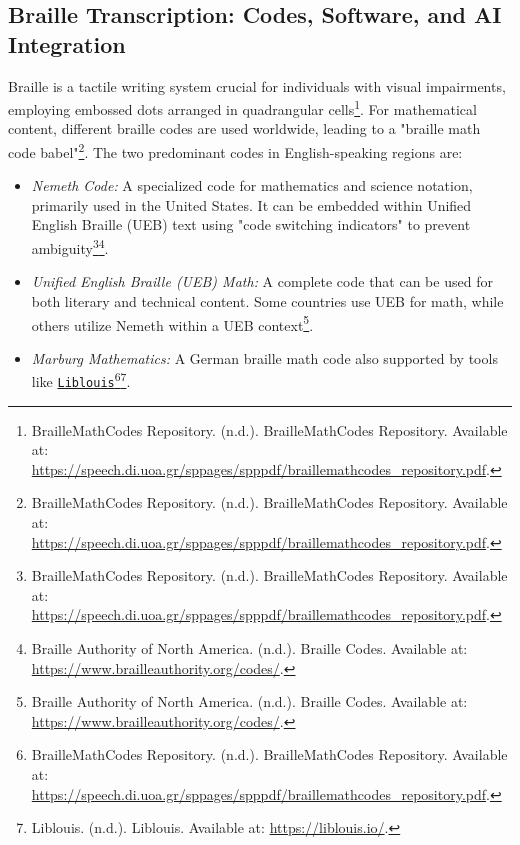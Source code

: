 \subsection{Braille Transcription: Codes, Software, and AI Integration}
Braille is a tactile writing system crucial for individuals with visual impairments, employing embossed dots arranged in quadrangular cells\footnote{BrailleMathCodes Repository. (n.d.). BrailleMathCodes Repository. Available at: \url{https://speech.di.uoa.gr/sppages/spppdf/braillemathcodes_repository.pdf}.}. For mathematical content, different braille codes are used worldwide, leading to a "braille math code babel"\footnote{BrailleMathCodes Repository. (n.d.). BrailleMathCodes Repository. Available at: \url{https://speech.di.uoa.gr/sppages/spppdf/braillemathcodes_repository.pdf}.}. The two predominant codes in English-speaking regions are:
\begin{itemize}
    \item \emph{Nemeth Code:} A specialized code for mathematics and science notation, primarily used in the United States. It can be embedded within Unified English Braille (UEB) text using "code switching indicators" to prevent ambiguity\footnote{BrailleMathCodes Repository. (n.d.). BrailleMathCodes Repository. Available at: \url{https://speech.di.uoa.gr/sppages/spppdf/braillemathcodes_repository.pdf}.}\footnote{Braille Authority of North America. (n.d.). Braille Codes. Available at: \url{https://www.brailleauthority.org/codes/}.}.
    \item \emph{Unified English Braille (UEB) Math:} A complete code that can be used for both literary and technical content. Some countries use UEB for math, while others utilize Nemeth within a UEB context\footnote{Braille Authority of North America. (n.d.). Braille Codes. Available at: \url{https://www.brailleauthority.org/codes/}.}.
    \item \emph{Marburg Mathematics:} A German braille math code also supported by tools like \href{https://liblouis.io/}{\texttt{Liblouis}}\footnote{BrailleMathCodes Repository. (n.d.). BrailleMathCodes Repository. Available at: \url{https://speech.di.uoa.gr/sppages/spppdf/braillemathcodes_repository.pdf}.}\footnote{Liblouis. (n.d.). Liblouis. Available at: \url{https://liblouis.io/}.}.
\end{itemize}

